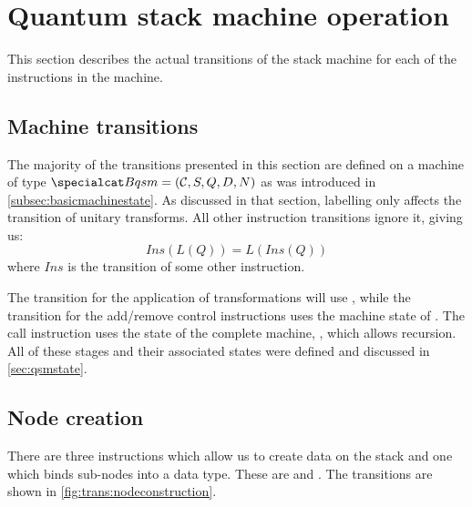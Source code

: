 \section{Quantum stack machine operation}\label{sec:stackmachineoperation}
This section describes the actual transitions of the stack
machine for each of the instructions in the machine.

\subsection{Machine transitions}\label{subsec:transitiondiagrams}
The majority of the transitions presented in this section are 
defined on 
a machine of type $\bms = (\cd,S,Q,D,N)$ as was 
introduced in \vref{subsec:basicmachinestate}.
As discussed in that section, labelling only affects the
transition of unitary transforms. All other instruction transitions 
ignore it, giving us:
\[ Ins(L(Q)) = L (Ins (Q)) \]
where $Ins$ is the transition of some other instruction.

The transition for the application of transformations will use \lbms, while
the transition for the add/remove control instructions 
uses the machine state of  \cms. 
The call instruction uses the 
state of the complete machine, \ms, which allows recursion.
All of these stages and their associated states were defined and discussed 
in  \vref{sec:qsmstate}.



\subsection{Node creation}\label{subsec:quantumstacknodecreation}
There are three instructions which allow us to create data on the 
stack and one which binds sub-nodes into a data type. These are 
 and . The transitions are shown
in \vref{fig:trans:nodeconstruction}.

